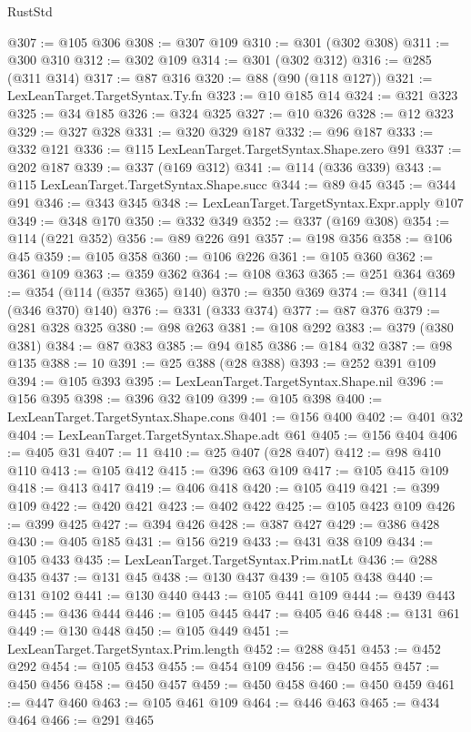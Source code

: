 \begin{lexlean}{RustStd}
\begin{coremodule}
{\begin{coremodule}
{{{{{{{{{{{{{{{{{{{{{{{{{{{{{{{{{{@307 := @105 @306
@308 := @307 @109
@310 := @301 (@302 @308)
@311 := @300 @310
@312 := @302 @109
@314 := @301 (@302 @312)
@316 := @285 (@311 @314)
@317 := @87 @316
@320 := @88 (@90 (@118 @127))
@321 := LexLeanTarget.TargetSyntax.Ty.fn
@323 := @10 @185 @14
@324 := @321 @323
@325 := @34 @185
@326 := @324 @325
@327 := @10 @326
@328 := @12 @323
@329 := @327 @328
@331 := @320 @329 @187
@332 := @96 @187
@333 := @332 @121
@336 := @115 LexLeanTarget.TargetSyntax.Shape.zero @91
@337 := @202 @187
@339 := @337 (@169 @312)
@341 := @114 (@336 @339)
@343 := @115 LexLeanTarget.TargetSyntax.Shape.succ
@344 := @89 @45
@345 := @344 @91
@346 := @343 @345
@348 := LexLeanTarget.TargetSyntax.Expr.apply @107
@349 := @348 @170
@350 := @332 @349
@352 := @337 (@169 @308)
@354 := @114 (@221 @352)
@356 := @89 @226 @91
@357 := @198 @356
@358 := @106 @45
@359 := @105 @358
@360 := @106 @226
@361 := @105 @360
@362 := @361 @109
@363 := @359 @362
@364 := @108 @363
@365 := @251 @364
@369 := @354 (@114 (@357 @365) @140)
@370 := @350 @369
@374 := @341 (@114 (@346 @370) @140)
@376 := @331 (@333 @374)
@377 := @87 @376
@379 := @281 @328 @325
@380 := @98 @263
@381 := @108 @292
@383 := @379 (@380 @381)
@384 := @87 @383
@385 := @94 @185
@386 := @184 @32
@387 := @98 @135
@388 := 10
@391 := @25 @388 (@28 @388)
@393 := @252 @391 @109
@394 := @105 @393
@395 := LexLeanTarget.TargetSyntax.Shape.nil
@396 := @156 @395
@398 := @396 @32 @109
@399 := @105 @398
@400 := LexLeanTarget.TargetSyntax.Shape.cons
@401 := @156 @400
@402 := @401 @32
@404 := LexLeanTarget.TargetSyntax.Shape.adt @61
@405 := @156 @404
@406 := @405 @31
@407 := 11
@410 := @25 @407 (@28 @407)
@412 := @98 @410 @110
@413 := @105 @412
@415 := @396 @63 @109
@417 := @105 @415 @109
@418 := @413 @417
@419 := @406 @418
@420 := @105 @419
@421 := @399 @109
@422 := @420 @421
@423 := @402 @422
@425 := @105 @423 @109
@426 := @399 @425
@427 := @394 @426
@428 := @387 @427
@429 := @386 @428
@430 := @405 @185
@431 := @156 @219
@433 := @431 @38 @109
@434 := @105 @433
@435 := LexLeanTarget.TargetSyntax.Prim.natLt
@436 := @288 @435
@437 := @131 @45
@438 := @130 @437
@439 := @105 @438
@440 := @131 @102
@441 := @130 @440
@443 := @105 @441 @109
@444 := @439 @443
@445 := @436 @444
@446 := @105 @445
@447 := @405 @46
@448 := @131 @61
@449 := @130 @448
@450 := @105 @449
@451 := LexLeanTarget.TargetSyntax.Prim.length
@452 := @288 @451
@453 := @452 @292
@454 := @105 @453
@455 := @454 @109
@456 := @450 @455
@457 := @450 @456
@458 := @450 @457
@459 := @450 @458
@460 := @450 @459
@461 := @447 @460
@463 := @105 @461 @109
@464 := @446 @463
@465 := @434 @464
@466 := @291 @465
}}}}}}}}}}}}}}}}}}}}}}}}}}}}}}}}}}
\end{coremodule}}
\end{coremodule}
\end{lexlean}
